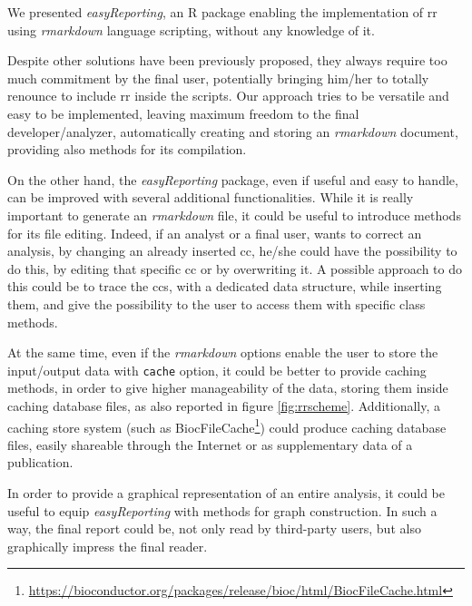 We presented \textit{easyReporting}, an R package enabling the implementation of \gls{rr} using \textit{rmarkdown} language scripting, without any knowledge of it.

Despite other solutions \cite{Napolitano2013, Napolitano2017} have been previously proposed, they always require too much commitment by the final user, potentially bringing him/her to totally renounce to include \gls{rr} inside the scripts.
Our approach tries to be versatile and easy to be implemented, leaving maximum freedom to the final developer/analyzer, automatically creating and storing an \textit{rmarkdown} document, providing also methods for its compilation.

On the other hand, the \textit{easyReporting} package, even if useful and easy to handle, can be improved with several additional functionalities.
While it is really important to generate an \textit{rmarkdown} file, it could be useful to introduce methods for its file editing. 
Indeed, if an analyst or a final user, wants to correct an analysis, by changing an already inserted \gls{cc}, he/she could have the possibility to do this, by editing that specific \gls{cc} or by overwriting it.
A possible approach to do this could be to trace the \glspl{cc}, with a dedicated data structure, while inserting them, and give the possibility to the user to access them with specific class methods.

At the same time, even if the \textit{rmarkdown} options enable the user to store the input/output data with \lstinline!cache! option, it could be better to provide caching methods, in order to give higher manageability of the data, storing them inside caching database files, as also reported in figure \ref{fig:rrscheme}.
Additionally, a caching store system (such as BiocFileCache\footnote{\url{https://bioconductor.org/packages/release/bioc/html/BiocFileCache.html}}) could produce caching database files, easily shareable through the Internet or as supplementary data of a publication.

In order to provide a graphical representation of an entire analysis, it could be useful to equip \textit{easyReporting} with methods for graph construction.
In such a way, the final report could be, not only read by third-party users, but also graphically impress the final reader.


